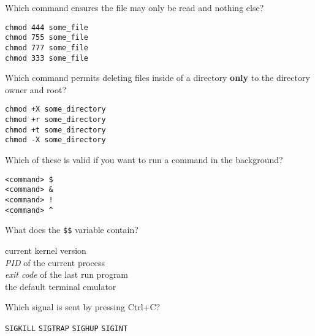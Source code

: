 \documentclass[a4paper,11pt]{exam}
\newcommand{\shell}[1]{\texttt{#1}}
\begin{document}
\begin{questions}
	\question
  Which command ensures the file may only be read and nothing else? 

	\begin{oneparchoices}
		\CorrectChoice \shell{chmod 444 some_file}\\ 
		\choice \shell{chmod 755 some_file} \\
		\choice \shell{chmod 777 some_file} \\
		\choice \shell{chmod 333 some_file}
	\end{oneparchoices}
	
	\question
	Which command permits deleting files inside of a directory \textbf{only} to the directory owner and root?
	
	\begin{oneparchoices}
		\choice \shell{chmod +X some_directory} \\
		\choice \shell{chmod +r some_directory} \\
    	\CorrectChoice \shell{chmod +t some_directory}\\ 	
	  \choice \shell{chmod -X some_directory}
	\end{oneparchoices}

	\question
	Which of these is valid if you want to run a command in the background?

	\begin{oneparchoices}
		\choice \shell{<command> \$} \\
		\CorrectChoice \shell{<command> \&} \\
		\choice \shell{<command> !} \\
		\choice \shell{<command> \textasciicircum} \\
	\end{oneparchoices}
	
	\question
  What does the \shell{\$\$} variable contain?

	\begin{oneparchoices}
				\choice current kernel version\\
		\CorrectChoice \textit{PID} of the current process \\ 
		\choice \textit{exit code} of the last run program \\
		\choice the default terminal emulator
	\end{oneparchoices}
	
	\question
  Which signal is sent by pressing Ctrl+C? 

  \begin{oneparchoices}
		\choice \shell{SIGKILL}
		\choice \shell{SIGTRAP}
    \choice \shell{SIGHUP}
    \CorrectChoice \shell{SIGINT}  
  \end{oneparchoices}


\end{questions}
\end{document}
